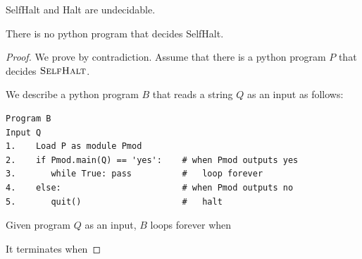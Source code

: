 
\begin{frame}
  \begin{lemma}
    {\sc SelfHalt} and {\sc Halt} are undecidable.
  \end{lemma}
\end{frame}

\begin{frame}[fragile=true]

  \begin{lemma}
    There is no python program that decides {\sc SelfHalt}.
  \end{lemma}
  \begin{proof}
    We prove by contradiction. Assume that there is a python program
    $P$ that decides $\textsc{SelfHalt}$.  \pause

    We describe a python program $B$ that reads a string $Q$ as an
    input as follows:

    {\small
\begin{verbatim}
Program B
Input Q
1.    Load P as module Pmod
2.    if Pmod.main(Q) == 'yes':    # when Pmod outputs yes
3.       while True: pass          #   loop forever 
4.    else:                        # when Pmod outputs no
5.       quit()                    #   halt
\end{verbatim}
    }

    Given program $Q$ as an input, $B$ loops forever when \pause

    It terminates when
  \end{proof}
\end{frame}

